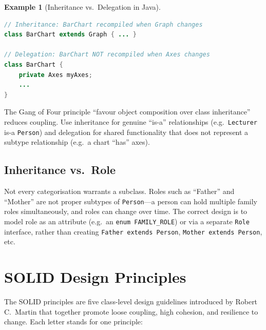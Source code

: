 \documentclass[11pt, a4paper, notitlepage]{report}
\theoremstyle{definition}
\theoremstyle{remark}
\theoremstyle{definition}
\newtheorem{example}[theorem]{Example}
\begin{document}
\begin{example}[Inheritance vs.\ Delegation in Java]
\label{ex:ch9-inherit-delegate}
\leavevmode
\begin{lstlisting}[language=Java]
// Inheritance: BarChart recompiled when Graph changes
class BarChart extends Graph { ... }

// Delegation: BarChart NOT recompiled when Axes changes
class BarChart {
    private Axes myAxes;
    ...
}
\end{lstlisting}
\end{example}

\begin{examtip}[title={Exam Tip: Favour Composition Over Inheritance}]
  The Gang of Four principle ``favour object composition over class inheritance''
  reduces coupling. Use inheritance for genuine ``is-a'' relationships (e.g.\
  \texttt{Lecturer} is-a \texttt{Person}) and delegation for shared functionality
  that does not represent a subtype relationship (e.g.\ a chart ``has'' axes).
\end{examtip}

\subsection{Inheritance vs.\ Role}
\label{subsec:ch9-inherit-vs-role}

Not every categorisation warrants a subclass. Roles such as ``Father'' and ``Mother''
are not proper subtypes of \texttt{Person}---a person can hold multiple family roles
simultaneously, and roles can change over time. The correct design is to model role as an
attribute (e.g.\ an \texttt{enum FAMILY\_ROLE}) or via a separate \texttt{Role} interface, rather
than creating \texttt{Father extends Person}, \texttt{Mother extends Person}, etc.

\section{SOLID Design Principles}
\label{sec:ch9-solid}

The SOLID principles are five class-level design guidelines introduced by Robert C.\ Martin
that together promote loose coupling, high cohesion, and resilience to change. Each letter
stands for one principle:
\end{document}
